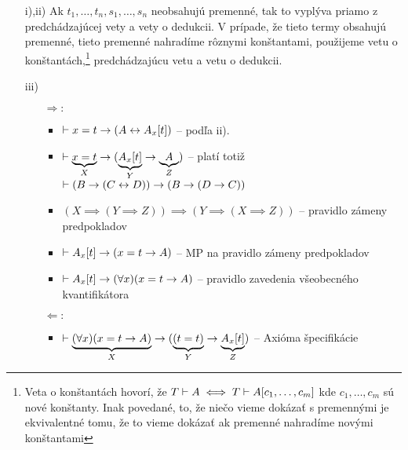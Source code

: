 \begin{dokaz}
    \noindent
    \begin{itemize}
        \item[i),ii)] Ak $t_1,\dots,t_n,s_1,\dots,s_n$ neobsahujú
            premenné, tak to vyplýva priamo z predchádzajúcej vety a vety
            o dedukcii. V prípade, že tieto termy obsahujú premenné,
            tieto premenné nahradíme rôznymi konštantami, použijeme
            vetu o konštantách,\footnote{Veta o konštantách hovorí, že
            $T \vdash A \iff T \vdash A[c_1,\dots,c_m]$ kde
            $c_1,\dots,c_m$ sú nové konštanty. Inak povedané,
            to, že niečo vieme dokázať s premennými je ekvivalentné
            tomu, že to vieme dokázať ak premenné nahradíme novými
            konštantami} predchádzajúcu vetu a vetu o dedukcii.
        \item[iii)]
            \begin{itemize}
            \item[$\Rightarrow:$]
                \begin{itemize}
                \item $\vdash x=t \rightarrow (A \leftrightarrow
                    A_x[t])$ -- podľa ii).
                \item $\vdash \underbrace{x=t}_X \rightarrow (
                    \underbrace{A_x[t]}_Y \rightarrow
                    \underbrace{A}_Z)$ -- platí totiž
                    $\vdash (B \rightarrow (C \leftrightarrow D))
                    \rightarrow (B \rightarrow (D \rightarrow C))$
                \item $(X \implies (Y \implies Z)) \implies
                       (Y \implies (X \implies Z))$ -- pravidlo zámeny
                       predpokladov
                \item $\vdash A_x[t] \rightarrow (x=t \rightarrow A)$ --
                    MP na pravidlo zámeny predpokladov
                \item $\vdash A_x[t] \rightarrow (\forall x)(x=t
                    \rightarrow A)$ -- pravidlo zavedenia všeobecného
                    kvantifikátora
                \end{itemize}

            \item[$\Leftarrow:$]
                \begin{itemize}
                \item $\vdash \underbrace{(\forall x)(x=t \rightarrow
                    A)}_X \rightarrow
                        (\underbrace{(t=t)}_Y \rightarrow
                        \underbrace{A_x[t]}_Z)$ -- Axióma špecifikácie


\end{itemize}
\end{itemize}
\end{itemize}
\end{dokaz}
